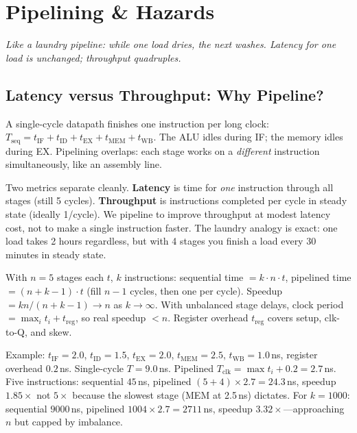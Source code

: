 \chapter{Pipelining \& Hazards}\label{ch:pipeline}
\begin{center}\small\textit{Like a laundry pipeline: while one load dries, the next washes. Latency for one load is unchanged; throughput quadruples.}\end{center}

\section{Latency versus Throughput: Why Pipeline?}
A single-cycle datapath finishes one instruction per long clock: $T_{\text{seq}}=t_{\text{IF}}+t_{\text{ID}}+t_{\text{EX}}+t_{\text{MEM}}+t_{\text{WB}}$. The ALU idles during IF; the memory idles during EX. Pipelining overlaps: each stage works on a \emph{different} instruction simultaneously, like an assembly line.

Two metrics separate cleanly. \textbf{Latency} is time for \emph{one} instruction through all stages (still 5 cycles). \textbf{Throughput} is instructions completed per cycle in steady state (ideally 1/cycle). We pipeline to improve throughput at modest latency cost, not to make a single instruction faster. The laundry analogy is exact: one load takes 2 hours regardless, but with 4 stages you finish a load every 30 minutes in steady state.

\begin{definition}
With $n=5$ stages each $t$, $k$ instructions: sequential time $=k\cdot n\cdot t$, pipelined time $=(n+k-1)\cdot t$ (fill $n-1$ cycles, then one per cycle). Speedup $=kn/(n+k-1)\to n$ as $k\to\infty$. With unbalanced stage delays, clock period $=\max_i t_i + t_{\text{reg}}$, so real speedup $<n$. Register overhead $t_{\text{reg}}$ covers setup, clk-to-Q, and skew.
\end{definition}

Example: $t_{\text{IF}}=2.0$, $t_{\text{ID}}=1.5$, $t_{\text{EX}}=2.0$, $t_{\text{MEM}}=2.5$, $t_{\text{WB}}=1.0$\,ns, register overhead $0.2$\,ns. Single-cycle $T=9.0$\,ns. Pipelined $T_{\text{clk}}=\max t_i+0.2=2.7$\,ns. Five instructions: sequential $45$\,ns, pipelined $(5+4)\times2.7=24.3$\,ns, speedup $1.85\times$ not $5\times$ because the slowest stage (MEM at 2.5\,ns) dictates. For $k=1000$: sequential $9000$\,ns, pipelined $1004\times2.7=2711$\,ns, speedup $3.32\times$---approaching $n$ but capped by imbalance.

